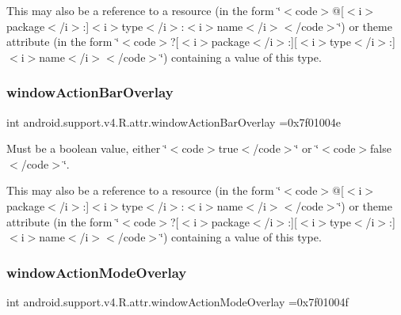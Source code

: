 This may also be a reference to a resource (in the form \char`\"{}$<$code$>$@\mbox{[}$<$i$>$package$<$/i$>$\+:\mbox{]}$<$i$>$type$<$/i$>$\+:$<$i$>$name$<$/i$>$$<$/code$>$\char`\"{}) or theme attribute (in the form \char`\"{}$<$code$>$?\mbox{[}$<$i$>$package$<$/i$>$\+:\mbox{]}\mbox{[}$<$i$>$type$<$/i$>$\+:\mbox{]}$<$i$>$name$<$/i$>$$<$/code$>$\char`\"{}) containing a value of this type. \mbox{\label{classandroid_1_1support_1_1v4_1_1R_1_1attr_a367af79f12a7d7ea5d9c5a55e0f1c09b}} 
\subsubsection{\texorpdfstring{window\+Action\+Bar\+Overlay}{windowActionBarOverlay}}
{\footnotesize\ttfamily int android.\+support.\+v4.\+R.\+attr.\+window\+Action\+Bar\+Overlay =0x7f01004e\hspace{0.3cm}{\ttfamily [static]}}

Must be a boolean value, either \char`\"{}$<$code$>$true$<$/code$>$\char`\"{} or \char`\"{}$<$code$>$false$<$/code$>$\char`\"{}. 

This may also be a reference to a resource (in the form \char`\"{}$<$code$>$@\mbox{[}$<$i$>$package$<$/i$>$\+:\mbox{]}$<$i$>$type$<$/i$>$\+:$<$i$>$name$<$/i$>$$<$/code$>$\char`\"{}) or theme attribute (in the form \char`\"{}$<$code$>$?\mbox{[}$<$i$>$package$<$/i$>$\+:\mbox{]}\mbox{[}$<$i$>$type$<$/i$>$\+:\mbox{]}$<$i$>$name$<$/i$>$$<$/code$>$\char`\"{}) containing a value of this type. \mbox{\label{classandroid_1_1support_1_1v4_1_1R_1_1attr_addc952329a9579398057228fff4e4326}} 
\subsubsection{\texorpdfstring{window\+Action\+Mode\+Overlay}{windowActionModeOverlay}}
{\footnotesize\ttfamily int android.\+support.\+v4.\+R.\+attr.\+window\+Action\+Mode\+Overlay =0x7f01004f\hspace{0.3cm}{\ttfamily [static]}}

